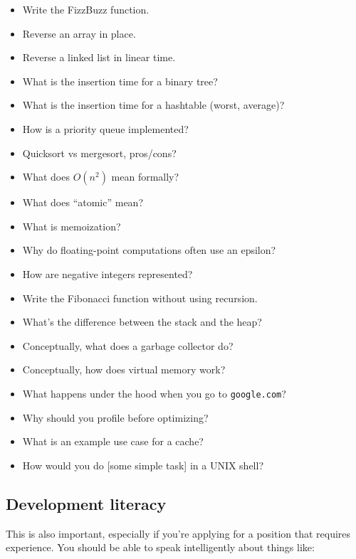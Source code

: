 \documentclass{article}
\begin{document}
\begin{itemize}
\item{Write the FizzBuzz function.}
\item{Reverse an array in place.}
\item{Reverse a linked list in linear time.}
\item{What is the insertion time for a binary tree?}
\item{What is the insertion time for a hashtable (worst, average)?}
\item{How is a priority queue implemented?}
\item{Quicksort vs mergesort, pros/cons?}
\item{What does $O(n^2)$ mean formally?}
\item{What does ``atomic'' mean?}
\item{What is memoization?}
\item{Why do floating-point computations often use an epsilon?}
\item{How are negative integers represented?}
\item{Write the Fibonacci function without using recursion.}
\item{What's the difference between the stack and the heap?}
\item{Conceptually, what does a garbage collector do?}
\item{Conceptually, how does virtual memory work?}
\item{What happens under the hood when you go to {\tt google.com}?}
\item{Why should you profile before optimizing?}
\item{What is an example use case for a cache?}
\item{How would you do [some simple task] in a UNIX shell?}
\end{itemize}

\subsection{Development literacy}
    This is also important, especially if you're applying for a position that
    requires experience. You should be able to speak intelligently about things
    like:
\end{document}
